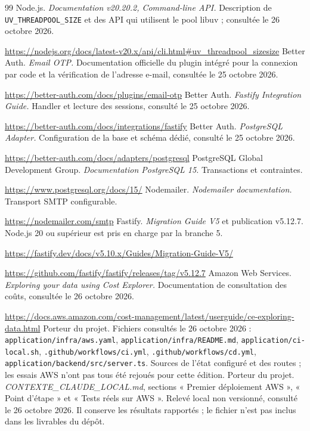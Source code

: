 \begin{thebibliography}{99}
 Node.js. \emph{Documentation v20.20.2, Command-line API.} Description de \texttt{UV\_THREADPOOL\_SIZE} et des API qui utilisent le pool libuv ; consultée le 26 octobre 2026.\par\url{https://nodejs.org/docs/latest-v20.x/api/cli.html\#uv\_threadpool\_sizesize}
 Better Auth. \emph{Email OTP.} Documentation officielle du plugin intégré pour la connexion par code et la vérification de l'adresse e-mail, consultée le 25 octobre 2026.\par\url{https://better-auth.com/docs/plugins/email-otp}
 Better Auth. \emph{Fastify Integration Guide.} Handler et lecture des sessions, consulté le 25 octobre 2026.\par\url{https://better-auth.com/docs/integrations/fastify}
 Better Auth. \emph{PostgreSQL Adapter.} Configuration de la base et schéma dédié, consulté le 25 octobre 2026.\par\url{https://better-auth.com/docs/adapters/postgresql}
 PostgreSQL Global Development Group. \emph{Documentation PostgreSQL 15.} Transactions et contraintes.\par\url{https://www.postgresql.org/docs/15/}
 Nodemailer. \emph{Nodemailer documentation.} Transport SMTP configurable.\par\url{https://nodemailer.com/smtp}
 Fastify. \emph{Migration Guide V5} et publication v5.12.7. Node.js 20 ou supérieur est pris en charge par la branche 5.\par\url{https://fastify.dev/docs/v5.10.x/Guides/Migration-Guide-V5/}\par\url{https://github.com/fastify/fastify/releases/tag/v5.12.7}
 Amazon Web Services. \emph{Exploring your data using Cost Explorer.} Documentation de consultation des coûts, consultée le 26 octobre 2026.\par\url{https://docs.aws.amazon.com/cost-management/latest/userguide/ce-exploring-data.html}
 Porteur du projet. Fichiers consultés le 26 octobre 2026 : \texttt{application/infra/aws.yaml}, \texttt{application/infra/README.md}, \texttt{application/ci-local.sh}, \texttt{.github/workflows/ci.yml}, \texttt{.github/workflows/cd.yml}, \texttt{application/backend/src/server.ts}. Sources de l'état configuré et des routes ; les essais AWS n'ont pas tous été rejoués pour cette édition.
 Porteur du projet. \emph{CONTEXTE\_CLAUDE\_LOCAL.md}, sections « Premier déploiement AWS », « Point d'étape » et « Tests réels sur AWS ». Relevé local non versionné, consulté le 26 octobre 2026. Il conserve les résultats rapportés ; le fichier n'est pas inclus dans les livrables du dépôt.
\end{thebibliography}

\endgroup
